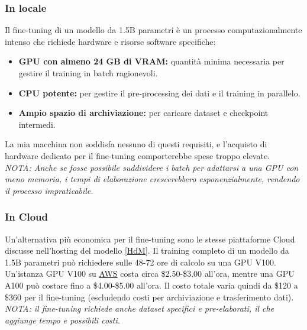 \documentclass[11pt]{article}
\begin{document}
\subsubsection{In locale}
Il fine-tuning di un modello da 1.5B parametri è un processo computazionalmente intenso
che richiede hardware e risorse software specifiche\autocite{j2024finetuningllmenterprise}:
\begin{itemize}
    \item \textbf{GPU con almeno 24 GB di VRAM:} quantità minima necessaria per 
    gestire il training in batch ragionevoli.
    \item \textbf{CPU potente:} per gestire il pre-processing dei dati e il training in parallelo.
    \item \textbf{Ampio spazio di archiviazione:} per caricare dataset e checkpoint intermedi.
\end{itemize}
La mia macchina non soddisfa nessuno di questi requisiti, e l’acquisto di hardware dedicato per il fine-tuning comporterebbe spese troppo elevate.\\
\textit{NOTA: Anche se fosse possibile suddividere i batch per adattarsi a una GPU con meno memoria, 
i tempi di elaborazione crescerebbero esponenzialmente, rendendo il processo impraticabile.}
\subsubsection{In Cloud}
Un'alternativa più economica per il fine-tuning sono le stesse piattaforme Cloud discusse nell'hosting del modello \ref{HdM}.
Il training completo di un modello da 1.5B parametri può richiedere sulle 48-72 ore di calcolo 
su una GPU V100. Un’istanza GPU V100 su \href{https://aws.amazon.com/it/}{AWS} costa circa \$2.50-\$3.00 all’ora, 
mentre una GPU A100 può costare fino a \$4.00-\$5.00 all’ora.
Il costo totale varia quindi da \$120 a \$360 per il fine-tuning 
(escludendo costi per archiviazione e trasferimento dati).\\
\textit{NOTA: il fine-tuning richiede anche dataset specifici e pre-elaborati, il che aggiunge tempo e possibili costi.}
\end{document}

